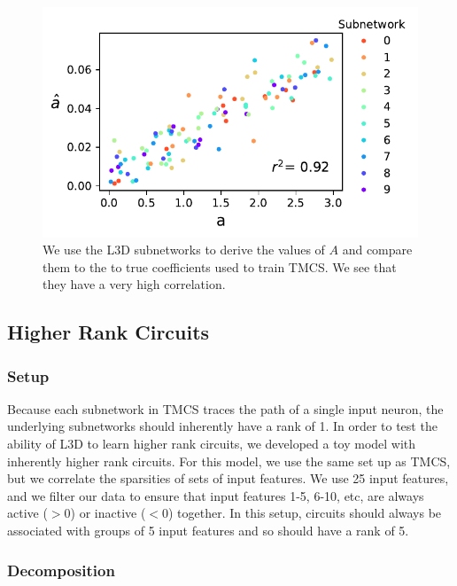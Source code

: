 \documentclass{article}
\theoremstyle{plain}
\theoremstyle{definition}
\theoremstyle{remark}
\begin{document}
\begin{figure}[htbp]
    \centerline{\includegraphics[width=\columnwidth]{../figures/6_circuit_superposition_coefficients.pdf}}
    \centering
    \caption{We use the L3D subnetworks to derive the values of $A$ and compare them to the to true coefficients used to train TMCS. We see that they have a very high correlation.}\label{fig:6_circuit_superposition_coefficients}
\end{figure}

\subsection{Higher Rank Circuits}

\subsubsection{Setup}
Because each subnetwork in TMCS traces the path of a single input neuron, the underlying subnetworks should inherently have a rank of 1. In order to test the ability of L3D to learn higher rank circuits, we developed a toy model with inherently higher rank circuits. For this model, we use the same set up as TMCS, but we correlate the sparsities of sets of input features. We use 25 input features, and we filter our data to ensure that input features 1-5, 6-10, etc, are always active ($>0$) or inactive ($<0$) together. In this setup, circuits should always be associated with groups of 5 input features and so should have a rank of 5.

\subsubsection{Decomposition}
\end{document}

